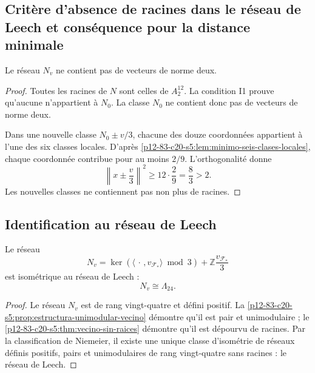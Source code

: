 \subsection{Critère d'absence de racines dans le réseau de Leech et conséquence pour la distance minimale}

\begin{theorem}
\label{p12-83-c20-s5:thm:vecino-sin-raices}
Le réseau \(N_v\) ne contient pas de vecteurs de norme deux.
\end{theorem}

\begin{proof}
Toutes les racines de \(N\) sont celles de \(A_2^{12}\). La condition I1 prouve
qu'aucune n'appartient à \(N_0\). La classe \(N_0\) ne contient donc pas
de vecteurs de norme deux.

Dans une nouvelle classe \(N_0\pm v/3\), chacune des douze coordonnées
appartient à l'une des six classes locales. D'après
\cref{p12-83-c20-s5:lem:minimo-seis-clases-locales}, chaque coordonnée contribue pour au moins
\(2/9\). L'orthogonalité donne
\[
 \left\|x\pm\frac v3\right\|^2
 \geq12\cdot\frac29=\frac83>2.
\]
Les nouvelles classes ne contiennent pas non plus de racines.
\end{proof}

\subsection{Identification au réseau de Leech}

\begin{theorem}
\label{p12-83-c20-s5:thm:identificacion-vecino-leech}
Le réseau
\begin{equation}
 N_v
 =\ker(\langle\,\cdot\,,v_{\mathcal F_*}\rangle\bmod3)
  +\mathbb Z\frac{v_{\mathcal F_*}}3
 \label{p12-83-c20-s5:eq:formula-final-vecino-leech}
\end{equation}
est isométrique au réseau de Leech :
\begin{equation}
 \boxed{N_v\cong\Lambda_{24}.}
 \label{p12-83-c20-s5:eq:identificacion-leech-autonoma}
\end{equation}
\end{theorem}

\begin{proof}
Le réseau \(N_v\) est de rang vingt-quatre et défini positif. La
\cref{p12-83-c20-s5:prop:estructura-unimodular-vecino} démontre qu'il est pair et unimodulaire ;
le \cref{p12-83-c20-s5:thm:vecino-sin-raices} démontre qu'il est dépourvu de racines. Par la
classification de Niemeier, il existe une unique classe d'isométrie de réseaux
définis positifs, pairs et unimodulaires de rang vingt-quatre sans racines :
le réseau de Leech.
\end{proof}

